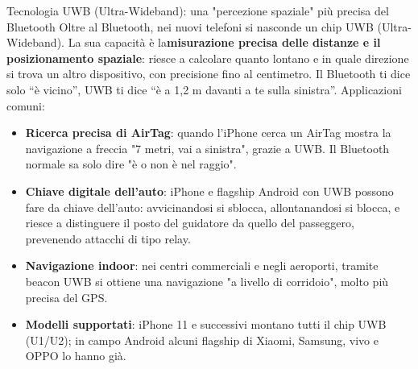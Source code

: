 \begin{tcbinfo}{Tecnologia UWB (Ultra-Wideband): una "percezione spaziale" più precisa del Bluetooth}
Oltre al Bluetooth, nei nuovi telefoni si nasconde un chip UWB (Ultra-Wideband). La sua capacità è la\textbf{misurazione precisa delle distanze e il posizionamento spaziale}: riesce a calcolare quanto lontano e in quale direzione si trova un altro dispositivo, con precisione fino al centimetro. Il Bluetooth ti dice solo “è vicino”, UWB ti dice “è a 1,2 m davanti a te sulla sinistra”. Applicazioni comuni:

\begin{itemize}
  \item \textbf{Ricerca precisa di AirTag}: quando l'iPhone cerca un AirTag mostra la navigazione a freccia "7 metri, vai a sinistra", grazie a UWB. Il Bluetooth normale sa solo dire "è o non è nel raggio".
  \item \textbf{Chiave digitale dell'auto}: iPhone e flagship Android con UWB possono fare da chiave dell'auto: avvicinandosi si sblocca, allontanandosi si blocca, e riesce a distinguere il posto del guidatore da quello del passeggero, prevenendo attacchi di tipo relay.
  \item \textbf{Navigazione indoor}: nei centri commerciali e negli aeroporti, tramite beacon UWB si ottiene una navigazione "a livello di corridoio", molto più precisa del GPS.
  \item \textbf{Modelli supportati}: iPhone 11 e successivi montano tutti il chip UWB (U1/U2); in campo Android alcuni flagship di Xiaomi, Samsung, vivo e OPPO lo hanno già.
\end{itemize}

\end{tcbinfo}

